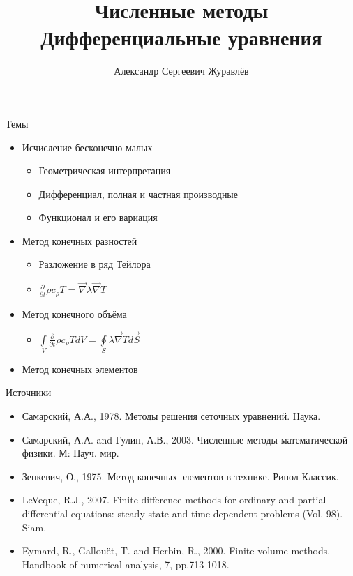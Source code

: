 \documentclass[12pt]{beamer}
\author{Александр Сергеевич Журавлёв}
\title[Дифференциальные уравнения]{Численные методы \\ Дифференциальные уравнения}
\institute{Физико-технический институт}
\begin{document}
\begin{frame}
    \titlepage
\end{frame}


\begin{frame}{Темы}
    \begin{itemize}
        \item Исчисление бесконечно малых
            \begin{itemize}
                \item Геометрическая интерпретация
                \item Дифференциал, полная и частная производные                
                \item Функционал и его вариация
            \end{itemize}
        \vspace{0.2 cm}    
        \item Метод конечных разностей
            \begin{itemize}
                \item Разложение в ряд Тейлора        
                \item $\frac{\partial}{\partial t} \rho c_{\rho} T = \vec{\nabla}  \lambda \vec{\nabla} T$      
            \end{itemize}
         \vspace{0.2 cm}     
        \item Метод конечного объёма
            \begin{itemize}
                \item $\int \limits_{V} \frac{\partial}{\partial t} \rho c_{\rho} T dV = \oint \limits_{S}  \lambda \vec{\nabla} T d \vec{S}$               
            \end{itemize}
        \vspace{0.2 cm}     
        \item Метод конечных элементов                             
    \end{itemize}
\end{frame}

\begin{frame}{Источники}
\begin{itemize}
        \item Самарский, А.А., 1978. Методы решения сеточных уравнений. Наука.
        \item Самарский, А.А. and Гулин, А.В., 2003. Численные методы математической физики. М: Науч. мир.
        \item Зенкевич, О., 1975. Метод конечных элементов в технике. Рипол Классик.
        \item LeVeque, R.J., 2007. Finite difference methods for ordinary and partial differential equations: steady-state and time-dependent problems (Vol. 98). Siam.
        \item Eymard, R., Gallouët, T. and Herbin, R., 2000. Finite volume methods. Handbook of numerical analysis, 7, pp.713-1018.
\end{itemize}
\end{frame}
\end{document}
